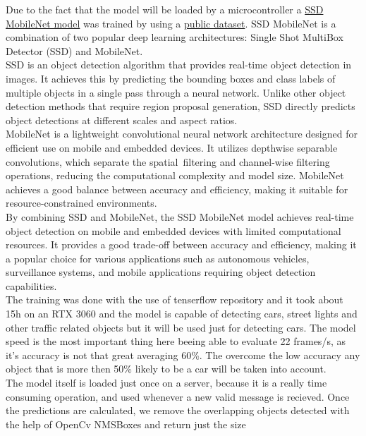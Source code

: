 \documentclass[17pt]{report}
\begin{document}
Due to the fact that the model will be loaded by a microcontroller a
\href{https://github.com/tensorflow/models/blob/master/research/object_detection/g3doc/tf2_detection_zoo.md}{SSD MobileNet model}
was trained by using a \href{https://universe.roboflow.com/pedro-azevedo-3c9ol/bdd100k-3zgda/dataset/5}{public dataset}.
SSD MobileNet is a combination of two popular deep learning architectures:
Single Shot MultiBox Detector (SSD) and MobileNet. \\
\indent
SSD is an object detection algorithm that provides real-time object detection in images.
It achieves this by predicting the bounding boxes and class labels of multiple objects
in a single pass through a neural network. Unlike other object detection methods that
require region proposal generation, SSD directly predicts object detections at different scales
and aspect ratios.\\
\indent
MobileNet is a lightweight convolutional neural network architecture designed for efficient use on
mobile and embedded devices. It utilizes depthwise separable convolutions, which separate the spatial\
filtering and channel-wise filtering operations, reducing the computational complexity and model size.
MobileNet achieves a good balance between accuracy and efficiency, making it suitable for
resource-constrained environments.\\
\indent
By combining SSD and MobileNet, the SSD MobileNet model achieves real-time object detection on mobile
and embedded devices with limited computational resources. It provides a good trade-off between accuracy
and efficiency, making it a popular choice for various applications such as autonomous vehicles,
surveillance systems, and mobile applications requiring object detection capabilities.\\
\indent
The training was done with the use of tenserflow repository and it took about 15h
on an RTX 3060 and the model is capable of detecting cars, street lights and other
traffic related objects but it will be used just for detecting cars. The model speed
is the most important thing here beeing able to evaluate 22 frames/s, as it's
accuracy is not that great averaging 60\%. The overcome the low accuracy any object 
that is more then 50\% likely to be a car will be taken into account.\\
\indent
The model itself is loaded just once on a server, because it is a really
time consuming operation, and used whenever a new valid message is recieved.
Once the predictions are calculated, we remove the overlapping objects
detected with the help of OpenCv NMSBoxes and return just the size 
\end{document}

